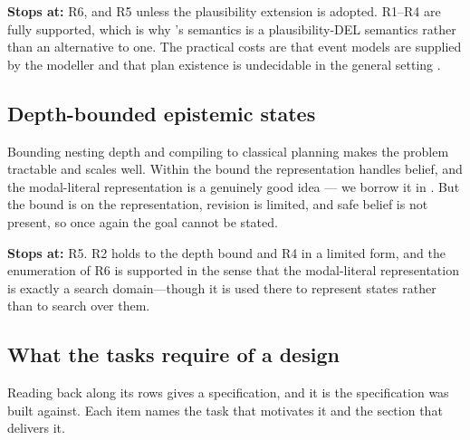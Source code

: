 \documentclass[11pt,a4paper]{article}
\begin{document}
\textbf{Stops at:} R6, and R5 unless the plausibility extension is adopted. R1--R4 are fully
supported, which is why \delhi's semantics is a plausibility-DEL semantics rather than an
alternative to one. The practical costs are that event models are supplied by the modeller and
that plan existence is undecidable in the general setting \citep{bolander2011}.

\subsection{Depth-bounded epistemic states}

Bounding nesting depth and compiling to classical planning \citep{muise2015} makes the
problem tractable and scales well. Within the bound the representation handles belief, and the
modal-literal representation is a genuinely good idea --- we borrow it in
. But the bound is on the representation, revision is limited, and safe
belief is not present, so once again the goal cannot be stated.

\textbf{Stops at:} R5. R2 holds to the depth bound and R4 in a limited form, and the enumeration of R6 is supported in the sense that the modal-literal representation is exactly a search domain---though it is used there to represent states rather than to search over them.

\subsection{What the tasks require of a design}
\label{sec:demands}

Reading  back along its rows gives a specification, and it is the
specification \delhi{} was built against. Each item names the task that motivates it and the
section that delivers it.
\end{document}
